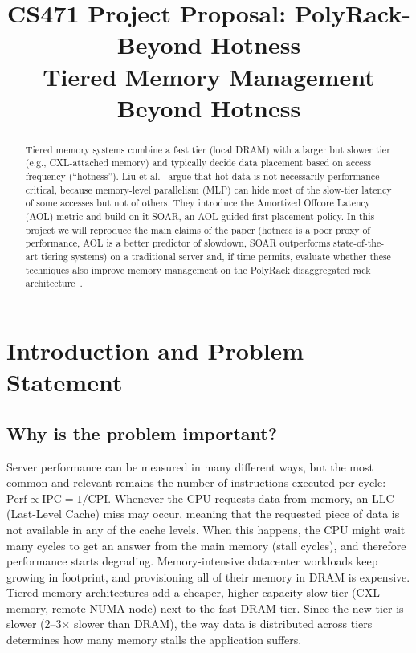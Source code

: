 \documentclass[conference]{IEEEtran}
\begin{document}
\title{CS471 Project Proposal: PolyRack-Beyond Hotness\\
\large Tiered Memory Management Beyond Hotness}

\author{
\and
{}
}

\maketitle

\begin{abstract}
Tiered memory systems combine a fast tier (local DRAM) with a larger but slower
tier (e.g., CXL-attached memory) and typically decide data placement based on
access frequency (``hotness''). Liu et al.~\cite{liu2025tiered} argue that hot
data is not necessarily performance-critical, because memory-level parallelism
(MLP) can hide most of the slow-tier latency of some accesses but not of
others. They introduce the Amortized Offcore Latency (AOL) metric and build on
it SOAR, an AOL-guided first-placement policy. In this project we will
reproduce the main claims of the paper (hotness is a poor proxy of
performance, AOL is a better predictor of slowdown, SOAR outperforms
state-of-the-art tiering systems) on a traditional server and, if time
permits, evaluate whether these techniques also improve memory management on
the PolyRack disaggregated rack architecture~\cite{polyrack}.
\end{abstract}

\section{Introduction and Problem Statement}
\label{sec:problem}

\subsection{Why is the problem important?}
Server performance can be measured in many different ways, but the most common and relevant remains the number of instructions executed per cycle: $\text{Perf} \propto \text{IPC} = 1/\text{CPI}$.
Whenever the CPU requests data from memory, an LLC (Last-Level Cache) miss may occur, meaning that the requested piece of data is not available in any of the cache levels.
When this happens, the CPU might wait many cycles to get an answer from the main memory (stall cycles), and therefore performance starts degrading.
Memory-intensive datacenter workloads keep growing in footprint, and provisioning all of
their memory in DRAM is expensive. 
Tiered memory architectures add a
cheaper, higher-capacity slow tier (CXL memory, remote NUMA node) next to the
fast DRAM tier. Since the new tier is slower (2--3$\times$ slower than DRAM), the way data is distributed across tiers
determines how many memory stalls the application suffers.
\end{document}
